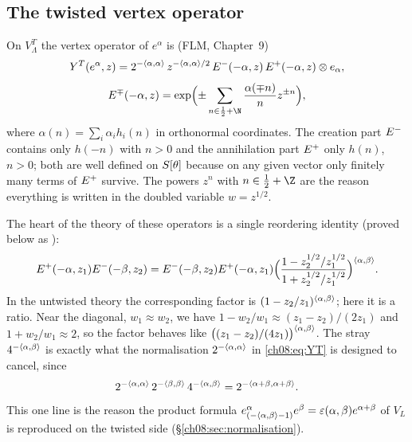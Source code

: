 \subsection{The twisted vertex operator}
On $V_\Lambda^T$ the vertex operator of $e^\alpha$ is (FLM, Chapter~9)
\begin{equation}\label{ch08:eq:YT}
  Y^T(e^\alpha,z)=2^{-\langle \alpha,\alpha\rangle}\,z^{-\langle \alpha,\alpha\rangle/2}\,
  E^{-}(-\alpha,z)\,E^{+}(-\alpha,z)\otimes e_\alpha,
\end{equation}
\begin{equation}\label{ch08:eq:Epm}
  \cheightE{\mp}(-\alpha,z)=\exp\Bigl(\pm\sum_{n\in\frac12+\N}\frac{\alpha(\mp n)}{n}z^{\pm n}\Bigr),
\end{equation}
where $\alpha(n)=\sum_i\alpha_i h_i(n)$ in orthonormal coordinates.  The creation part
$E^{-}$ contains only $h(-n)$ with $n>0$ and the annihilation part $E^{+}$ only
$h(n)$, $n>0$; both are well defined on $S[\theta]$ because on any given vector only finitely
many terms of $E^{+}$ survive.  The powers $z^{n}$ with $n\in\frac12+\Z$ are the reason
everything is written in the doubled variable $w=z^{1/2}$.

The heart of the theory of these operators is a single reordering identity (proved below as
):
\begin{equation}\label{ch08:eq:reorder}
  E^{+}(-\alpha,z_1)E^{-}(-\beta,z_2)
  =E^{-}(-\beta,z_2)E^{+}(-\alpha,z_1)
   \Bigl(\frac{1-z_2^{1/2}/z_1^{1/2}}{1+z_2^{1/2}/z_1^{1/2}}\Bigr)^{\langle \alpha,\beta\rangle}.
\end{equation}
In the untwisted theory the corresponding factor is $(1-z_2/z_1)^{\langle \alpha,\beta\rangle}$; here
it is a ratio.  Near the diagonal, $w_1\approx w_2$, we have $1-w_2/w_1\approx(z_1-z_2)/(2z_1)$
and $1+w_2/w_1\approx 2$, so the factor behaves like
$\bigl((z_1-z_2)/(4z_1)\bigr)^{\langle \alpha,\beta\rangle}$.  The stray $4^{-\langle \alpha,\beta\rangle}$ is
exactly what the normalisation $2^{-\langle \alpha,\alpha\rangle}$ in \eqref{ch08:eq:YT} is designed to
cancel, since
\begin{equation}\label{ch08:eq:norm}
  2^{-\langle \alpha,\alpha\rangle}\,2^{-\langle \beta,\beta\rangle}\,4^{-\langle \alpha,\beta\rangle}
  =2^{-\langle \alpha+\beta,\alpha+\beta\rangle} .
\end{equation}
This one line is the reason the product formula $e^\alpha_{(-\langle \alpha,\beta\rangle-1)}e^\beta
=\varepsilon(\alpha,\beta)e^{\alpha+\beta}$ of $V_L$ is reproduced on the twisted side
(\S\ref{ch08:sec:normalisation}).

